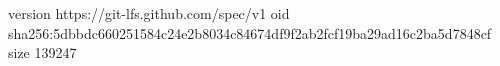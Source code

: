 version https://git-lfs.github.com/spec/v1
oid sha256:5dbbdc660251584c24e2b8034c84674df9f2ab2fcf19ba29ad16c2ba5d7848cf
size 139247
